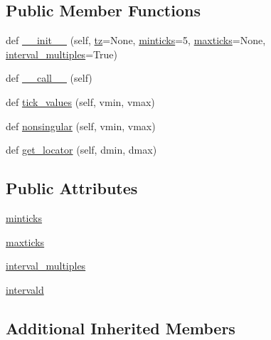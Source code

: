 \subsection*{Public Member Functions}
\begin{DoxyCompactItemize}
\item 
def \hyperlink{classmatplotlib_1_1dates_1_1AutoDateLocator_ad00e4d357d7b24a5f51861ee62bcb81d}{\+\_\+\+\_\+init\+\_\+\+\_\+} (self, \hyperlink{classmatplotlib_1_1dates_1_1DateLocator_aa18faf34dbf00ed4820535b64cd7194e}{tz}=None, \hyperlink{classmatplotlib_1_1dates_1_1AutoDateLocator_a3c9772d4e997c861a625f5ac6dc8426b}{minticks}=5, \hyperlink{classmatplotlib_1_1dates_1_1AutoDateLocator_aee36818b4fe02ff583ede0f7e8cba583}{maxticks}=None, \hyperlink{classmatplotlib_1_1dates_1_1AutoDateLocator_a52fbc40022f309b8901e265465e3c0f0}{interval\+\_\+multiples}=True)
\item 
def \hyperlink{classmatplotlib_1_1dates_1_1AutoDateLocator_a97ef3f072d16af63adf1ac26e26a436e}{\+\_\+\+\_\+call\+\_\+\+\_\+} (self)
\item 
def \hyperlink{classmatplotlib_1_1dates_1_1AutoDateLocator_a63eb45a6809e7f028e64633838639fa6}{tick\+\_\+values} (self, vmin, vmax)
\item 
def \hyperlink{classmatplotlib_1_1dates_1_1AutoDateLocator_a99518bb7db17b6315349ac4db4f2dc00}{nonsingular} (self, vmin, vmax)
\item 
def \hyperlink{classmatplotlib_1_1dates_1_1AutoDateLocator_a2d726a7808b13a1ae3b3e00dfb9a4e2c}{get\+\_\+locator} (self, dmin, dmax)
\end{DoxyCompactItemize}
\subsection*{Public Attributes}
\begin{DoxyCompactItemize}
\item 
\hyperlink{classmatplotlib_1_1dates_1_1AutoDateLocator_a3c9772d4e997c861a625f5ac6dc8426b}{minticks}
\item 
\hyperlink{classmatplotlib_1_1dates_1_1AutoDateLocator_aee36818b4fe02ff583ede0f7e8cba583}{maxticks}
\item 
\hyperlink{classmatplotlib_1_1dates_1_1AutoDateLocator_a52fbc40022f309b8901e265465e3c0f0}{interval\+\_\+multiples}
\item 
\hyperlink{classmatplotlib_1_1dates_1_1AutoDateLocator_a1864bf3cf0382c202fc1199e40dab156}{intervald}
\end{DoxyCompactItemize}
\subsection*{Additional Inherited Members}


